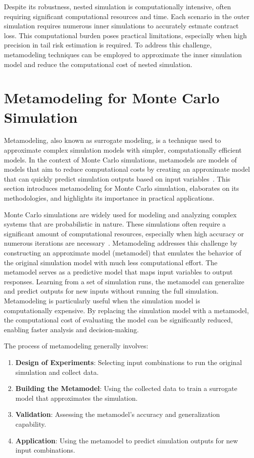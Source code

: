 Despite its robustness, nested simulation is computationally intensive, often requiring significant computational resources and time. 
Each scenario in the outer simulation requires numerous inner simulations to accurately estmate contract loss. 
This computational burden poses practical limitations, especially when high precision in tail risk estimation is required.
To address this challenge, metamodeling techniques can be employed to approximate the inner simulation model and reduce the computational cost of nested simulation.

\section{Metamodeling for Monte Carlo Simulation}

Metamodeling, also known as surrogate modeling, is a technique used to approximate complex simulation models with simpler, computationally efficient models. 
In the context of Monte Carlo simulations, metamodels are models of models that aim to reduce computational costs by creating an approximate model that can quickly predict simulation outputs based on input variables~\citep{kleijnen2018design}. 
This section introduces metamodeling for Monte Carlo simulation, elaborates on its methodologies, and highlights its importance in practical applications.

Monte Carlo simulations are widely used for modeling and analyzing complex systems that are probabilistic in nature. 
These simulations often require a significant amount of computational resources, especially when high accuracy or numerous iterations are necessary~\citep{glasserman2004monte}. 
Metamodeling addresses this challenge by constructing an approximate model (metamodel) that emulates the behavior of the original simulation model with much less computational effort.
The metamodel serves as a predictive model that maps input variables to output responses. 
Learning from a set of simulation runs, the metamodel can generalize and predict outputs for new inputs without running the full simulation.
Metamodeling is particularly useful when the simulation model is computationally expensive. 
By replacing the simulation model with a metamodel, the computational cost of evaluating the model can be significantly reduced, enabling faster analysis and decision-making.

The process of metamodeling generally involves:

\begin{enumerate} 
    \item \textbf{Design of Experiments}: Selecting input combinations to run the original simulation and collect data. 
    \item \textbf{Building the Metamodel}: Using the collected data to train a surrogate model that approximates the simulation. 
    \item \textbf{Validation}: Assessing the metamodel's accuracy and generalization capability.
    \item \textbf{Application}: Using the metamodel to predict simulation outputs for new input combinations.
\end{enumerate}

